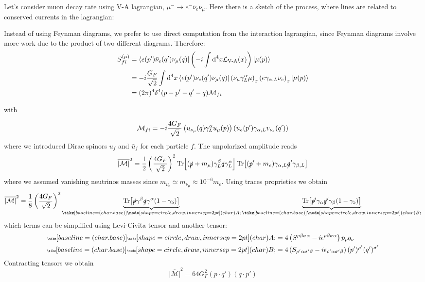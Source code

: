 \documentclass[TheoreticalPhy_ModB.tex]{subfiles}
\begin{document}
Let's consider muon decay rate using V-A lagrangian, $\mu^-\to e^-\bar \nu_e\nu_\mu$. Here there is a sketch of the process, where lines are related to conserved currents in the lagrangian:

\begin{figure}[H]
\centering

\end{figure}

Instead of using Feynman diagrams, we prefer to use direct computation from the interaction lagrangian, since Feynman diagrams involve more work due to the product of two different diagrams. Therefore:
\begin{align*}
S_{fi}^{(\mu)}
&=\bra{e(p')\bar\nu_e(q')\nu_\mu(q)}\left(-i\int\textup{d}^4x\mathcal L_{\text{V-A}}(x)\right)\ket{\mu(p)}\\
&=-i\frac{G_F}{\sqrt2}\int\textup{d}^4x\bra{e(p')\bar\nu_e(q')\nu_\mu(q)}\left(\bar \nu_\mu\gamma^\alpha_L\mu\right)_x\left(\bar e \gamma_{\alpha,L}\nu_e\right)_x\ket{\mu(p)}\\
&=(2\pi)^4\delta^4(p-p'-q'-q)\mathcal M_{fi}
\end{align*}

with

\[\mathcal M_{fi}=-i\frac{4G_F}{\sqrt2}\left(u_{\nu_\mu}(q)\gamma^\alpha_Lu_\mu(p)\right)\left(\bar u_e(p')\gamma_{\alpha,L}v_{\nu_e}(q')\right)\]
where we introduced Dirac spinors $u_f$ and $\bar u_f$ for each particle $f$. The unpolarized amplitude reads
\[\overline{|\mathcal M|}^2
=\frac12\left(\frac{4G_F}{\sqrt2}\right)^2\Tr[(\slashed p+m_\mu)\gamma^\beta_L\slashed q\gamma^\alpha_L]\Tr[(\slashed p'+m_e)\gamma_{\alpha,L}\slashed q'\gamma_{\beta, L}]\]
where we assumed vanishing neutrinos masses since $m_{\nu_e}\simeq m_{\nu_\mu}\approx 10^{-6}m_e$. Using traces proprieties we obtain
\[\overline{|\mathcal M|}^2
=\frac18\p{\frac{4G_F}{\sqrt2}}^2\underbrace{\Tr[\slashed p\gamma^\beta\slashed q\gamma^\alpha(1-\gamma_5)]}_{\tiny\circled A}\underbrace{\Tr[\slashed p'\gamma_{\alpha}\slashed q'\gamma_{\beta}(1-\gamma_5)]}_{\tiny\circled B}\]
which terms can be simplified using Levi-Civita tensor and another tensor:
\begin{align*}
{\tiny\circled A}&=4\p{S^{\rho\beta\sigma\alpha}-i\epsilon^{\rho\beta\sigma\alpha}}p_\rho q_\sigma\\
{\tiny\circled B}&=4\p{S_{\rho'\alpha\sigma'\beta}-i\epsilon_{\rho'\alpha\sigma'\beta}}(p')^{\rho'}(q')^{\sigma'}
\end{align*}
Contracting tensors we obtain 
\[\overline{|\mathcal M|}^2
=64G_F^2(p\cdot q')(q\cdot p')\]
\end{document}
